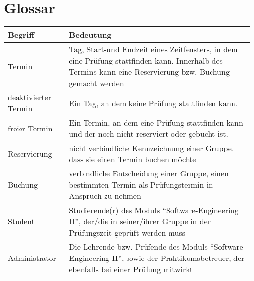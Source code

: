 \section{Glossar}

\begin{tabulary}{1.0\textwidth}{LL}
  \hline
  Begriff &
  Bedeutung \\
  \hline

  Termin &
  Tag, Start-und Endzeit eines Zeitfensters, in dem eine Prüfung
  stattfinden kann. Innerhalb des Termins kann eine Reservierung bzw.
  Buchung gemacht werden \\

  deaktivierter Termin &
  Ein Tag, an dem keine Prüfung stattfinden kann. \\

  freier Termin &
  Ein Termin, an dem eine Prüfung stattfinden kann und der noch nicht
  reserviert oder gebucht ist. \\

  Reservierung &
  nicht verbindliche Kennzeichnung einer Gruppe, dass sie einen Termin
  buchen möchte \\

  Buchung &
  verbindliche Entscheidung einer Gruppe, einen bestimmten Termin als
  Prüfungstermin in Anspruch zu nehmen \\

  Student &
  Studierende(r) des Moduls ``Software-Engineering II'', der/die in seiner/ihrer Gruppe in der Prüfungszeit geprüft werden muss \\

  Administrator &
  Die Lehrende bzw. Prüfende des Moduls ``Software-Engineering II'', sowie der Praktikumsbetreuer, der ebenfalls bei einer Prüfung mitwirkt \\
  \hline
\end{tabulary}
